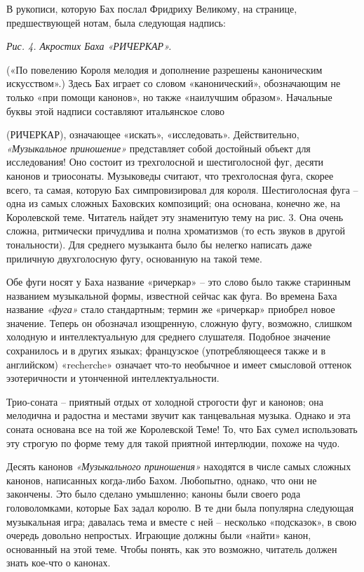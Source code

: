 \documentclass[../main.tex]{subfiles}
\begin{document}
В рукописи, которую Бах послал Фридриху Великому, на странице, предшествующей нотам, была следующая надпись:

\emph{Рис. 4. Акростих Баха «РИЧЕРКАР».}

(«По повелению Короля мелодия и дополнение разрешены каноническим искусством».) Здесь Бах играет со словом «канонический», обозначающим не только «при помощи канонов», но также «наилучшим образом». Начальные буквы этой надписи составляют итальянское слово
\begin{center}
    \foreignlanguage{english}{}
\end{center}
(РИЧЕРКАР), означающее «искать», «исследовать». Действительно, \emph{«Музыкальное приношение»} представляет собой достойный объект для исследования! Оно состоит из трехголосной и шестиголосной фуг, десяти канонов и триосонаты. Музыковеды считают, что трехголосная фуга, скорее всего, та самая, которую Бах симпровизировал для короля. Шестиголосная фуга \--- одна из самых сложных Баховских композиций; она основана, конечно же, на Королевской теме. Читатель найдет эту знаменитую тему на рис. 3. Она очень сложна, ритмически причудлива и полна хроматизмов (то есть звуков в другой тональности). Для среднего музыканта было бы нелегко написать даже приличную двухголосную фугу, основанную на такой теме.

Обе фуги носят у Баха название «ричеркар» \--- это слово было также старинным названием музыкальной формы, известной сейчас как фуга. Во времена Баха название \emph{«фуга»} стало стандартным; термин же «ричеркар» приобрел новое значение. Теперь он обозначал изощренную, сложную фугу, возможно, слишком холодную и интеллектуальную для среднего слушателя. Подобное значение сохранилось и в других языках; французское (употребляющееся так­же и в английском) «recherche» означает что-то необычное и имеет смысловой оттенок эзотеричности и утонченной интеллектуальности.

Трио-соната \--- приятный отдых от холодной строгости фуг и канонов; она мелодична и радостна и местами звучит как танцевальная музыка. Однако и эта соната основана все на той же Королевской Теме! То, что Бах сумел использовать эту строгую по форме тему для такой приятной интерлюдии, похоже на чудо.

Десять канонов \emph{«Музыкального приношения»} находятся в числе самых сложных канонов, написанных когда-либо Бахом. Любопытно, однако, что они не закончены. Это было сделано умышленно; каноны были своего рода головоломками, которые Бах задал королю. В те дни была популярна следующая музыкальная игра; давалась тема и вместе с ней \--- несколько «подсказок», в свою очередь довольно непростых. Играющие должны были «найти» канон, основанный на этой теме. Чтобы понять, как это возможно, читатель должен знать кое-что о канонах.
\end{document}
